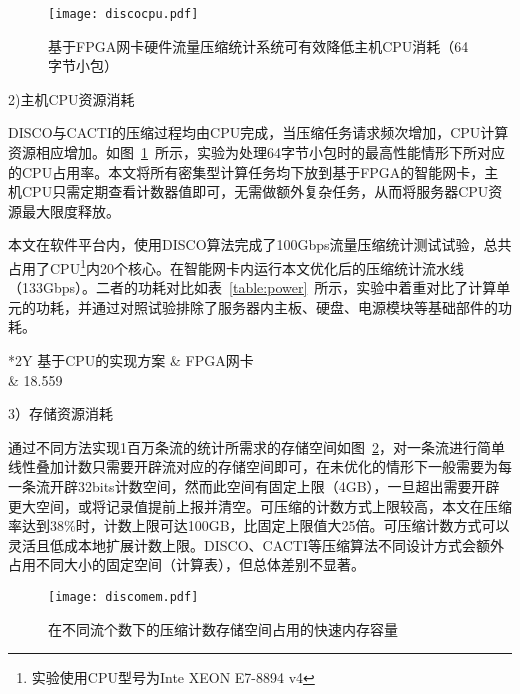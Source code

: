 \begin{figure}[!ht]
	\centering 
	\vspace{-1.5mm} 
	\texttt{[image: discocpu.pdf]}
	\caption{基于FPGA网卡硬件流量压缩统计系统可有效降低主机CPU消耗（64字节小包）} \label{fig:discocpu}
\end{figure}


2)主机CPU资源消耗

DISCO与CACTI的压缩过程均由CPU完成，当压缩任务请求频次增加，CPU计算资源相应增加。如图~\ref{fig:discocpu}~所示，实验为处理64字节小包时的最高性能情形下所对应的CPU占用率。本文将所有密集型计算任务均下放到基于FPGA的智能网卡，主机CPU只需定期查看计数器值即可，无需做额外复杂任务，从而将服务器CPU资源最大限度释放。

本文在软件平台内，使用DISCO算法完成了100Gbps流量压缩统计测试试验，总共占用了CPU\footnote{实验使用CPU型号为Inte XEON E7-8894 v4}内20个核心。在智能网卡内运行本文优化后的压缩统计流水线（133Gbps）。二者的功耗对比如表~\ref{table:power}~所示，实验中着重对比了计算单元的功耗，并通过对照试验排除了服务器内主板、硬盘、电源模块等基础部件的功耗。

\begin{table}[!ht]
	\renewcommand{\arraystretch}{1.2}
	\centering\wuhao
	\caption{不同平台下压缩统计功能功耗对比（单位：瓦特）} \label{table:power} \vspace{4mm}
	\begin{tabularx}{\textwidth}{*{2}Y}
		\toprule[1.5pt]
		基于CPU的实现方案 & FPGA网卡 \\
		 & 18.559\\
		\bottomrule[1.5pt]
	\end{tabularx}
\end{table}

3）存储资源消耗

通过不同方法实现1百万条流的统计所需求的存储空间如图~\ref{fig:discomem}，对一条流进行简单线性叠加计数只需要开辟流对应的存储空间即可，在未优化的情形下一般需要为每一条流开辟32bits计数空间，然而此空间有固定上限（4GB），一旦超出需要开辟更大空间，或将记录值提前上报并清空。可压缩的计数方式上限较高，本文在压缩率达到38\%时，计数上限可达100GB，比固定上限值大25倍。可压缩计数方式可以灵活且低成本地扩展计数上限。DISCO、CACTI等压缩算法不同设计方式会额外占用不同大小的固定空间（计算表），但总体差别不显著。

\begin{figure}[!ht]
	\centering 
	\vspace{-1.5mm} 
	\texttt{[image: discomem.pdf]}
	\caption{在不同流个数下的压缩计数存储空间占用的快速内存容量} \label{fig:discomem}
\end{figure}



